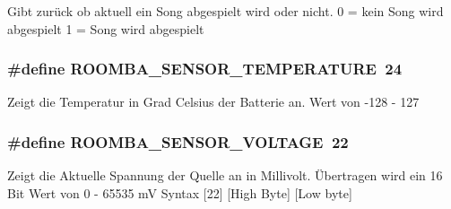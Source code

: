 Gibt zurück ob aktuell ein Song abgespielt wird oder nicht. 0 = kein Song wird abgespielt 1 = Song wird abgespielt \hypertarget{group__roomba__sensor__intern_ga85ef57858eeae88cc5df14dcf15b0b8f}{
\subsubsection[{R\-O\-O\-M\-B\-A\-\_\-\-S\-E\-N\-S\-O\-R\-\_\-\-T\-E\-M\-P\-E\-R\-A\-T\-U\-R\-E}]{\setlength{\rightskip}{0pt plus 5cm}\#define R\-O\-O\-M\-B\-A\-\_\-\-S\-E\-N\-S\-O\-R\-\_\-\-T\-E\-M\-P\-E\-R\-A\-T\-U\-R\-E~24}}\label{group__roomba__sensor__intern_ga85ef57858eeae88cc5df14dcf15b0b8f}
Zeigt die Temperatur in Grad Celsius der Batterie an. Wert von -\/128 -\/ 127 \hypertarget{group__roomba__sensor__intern_gabb81e3accaa18eb61bbbe3ebe3f30f41}{
\subsubsection[{R\-O\-O\-M\-B\-A\-\_\-\-S\-E\-N\-S\-O\-R\-\_\-\-V\-O\-L\-T\-A\-G\-E}]{\setlength{\rightskip}{0pt plus 5cm}\#define R\-O\-O\-M\-B\-A\-\_\-\-S\-E\-N\-S\-O\-R\-\_\-\-V\-O\-L\-T\-A\-G\-E~22}}\label{group__roomba__sensor__intern_gabb81e3accaa18eb61bbbe3ebe3f30f41}
Zeigt die Aktuelle Spannung der Quelle an in Millivolt. Übertragen wird ein 16 Bit Wert von 0 -\/ 65535 m\-V Syntax \mbox{[}22\mbox{]} \mbox{[}High Byte\mbox{]} \mbox{[}Low byte\mbox{]} 
